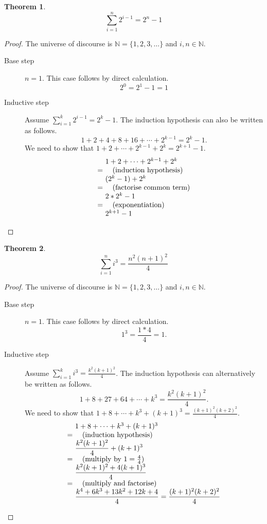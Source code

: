\documentclass[a4paper,11pt]{article}
\makeatletter
\theoremstyle{plain}
\newtheorem{theorem}{Theorem}[section]
\theoremstyle{definition}
\newcommand{\ba}{\begin{array}}
\newcommand{\ea}{\end{array}}
\newenvironment{derivation}{\begin{displaymath}\ba{@{}r@{~}l@{}}}{\ea\end{displaymath}\ignorespacesafterend}
\newcommand{\reason}[1]{\quad (\text{#1})}
\makeatother
\begin{document}
\begin{theorem}
  \[
    \displaystyle\sum_{i=1}^n2^{i-1} = 2^n-1
  \]
\end{theorem}
\begin{proof}
  The universe of discourse is $\mathbb{N} = \{1,2,3,\dots\}$ and $i,n\in\mathbb{N}$.
  \begin{description}
  \item[Base step] $n = 1$. This case follows by direct calculation.
    \[
      2^0 = 2^1 - 1 = 1
    \]
  \item[Inductive step] Assume $\sum_{i = 1}^k2^{i-1} = 2^k - 1$. The
    induction hypothesis can also be written as follows.
    \[
      1 + 2 + 4 + 8 + 16 + \cdots + 2^{k-1} = 2^k - 1.
    \]
    We need to show that $1+2+\cdots+2^{k-1}+2^k = 2^{k+1} - 1$.
    \begin{derivation}
      &1+2+\cdots+2^{k-1}+2^k\\
      =& \reason{induction hypothesis}\\
      &(2^k - 1) + 2^k\\
      =& \reason{factorise common term}\\
      & 2*2^k - 1\\
      =& \reason{exponentiation}\\
      &2^{k+1} - 1
    \end{derivation}
  \end{description}
\end{proof}

\begin{theorem}
  \[
    \displaystyle\sum_{i=1}^ni^3 = \frac{n^2(n+1)^2}{4}
  \]
\end{theorem}
\begin{proof}
  The universe of discourse is $\mathbb{N} = \{1,2,3,\dots\}$ and $i,n\in\mathbb{N}$.
  \begin{description}
  \item[Base step] $n = 1$. This case follows by direct calculation.
    \[
      1^3 = \frac{1*4}{4} = 1.
    \]
  \item[Inductive step] Assume
    $\sum_{i = 1}^ki^3 = \frac{k^2(k + 1)^2}{4}$. The induction
    hypothesis can alternatively be written as follows.
    \[
      \displaystyle 1+8+27+64+\cdots+k^3 = \frac{k^2(k+1)^2}{4}.
    \]
    We need to show that $1+8+\cdots+k^3+(k + 1)^3 = \frac{(k+1)^2(k+2)^2}{4}$.
    \begin{derivation}
      &1+8+\cdots+k^3+(k + 1)^3\\
      =& \reason{induction hypothesis}\\
      & \displaystyle\frac{k^2(k+1)^2}{4} + (k+1)^3\\
      =& \reason{multiply by $1 = \frac{4}{4}$}\\
      & \displaystyle\frac{k^2(k+1)^2 + 4(k+1)^3}{4}\\
      =& \reason{multiply and factorise}\\
      &\displaystyle\frac{k^4 + 6k^3 + 13k^2 + 12k + 4}{4} = \frac{(k+1)^2(k+2)^2}{4}
    \end{derivation}
  \end{description}
\end{proof}
\end{document}
